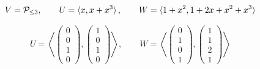 $$ V = \mathcal{P}_{\le 3}, \qquad U = \braket{x, x + x^3}, \qquad W = \braket{1 + x^2, 1 + 2x + x^2 + x^3} $$

$$ U = \left\langle
\begin{pmatrix}
	0 \\
    0 \\
    1 \\
    0
\end{pmatrix},
\begin{pmatrix}
	1 \\
    0 \\
    1 \\
    0
\end{pmatrix} \right\rangle, \qquad W = \left\langle
\begin{pmatrix}
	0 \\
    1 \\
    0 \\
    1
\end{pmatrix},
\begin{pmatrix}
	1 \\
    1 \\
    2 \\
    1
\end{pmatrix} \right\rangle $$

